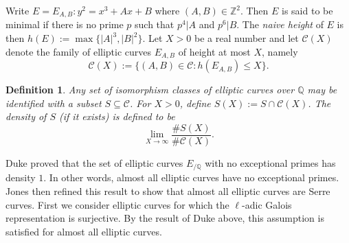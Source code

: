 \documentclass[table]{amsart}
\newtheorem{definition}[theorem]{Definition}
\newcommand{\Z}{\mathbb{Z}}
\newcommand{\Q}{\mathbb{Q}}
\newcommand{\cC}{\mathcal{C}}
\newcommand{\op}[1]{\operatorname{#1}}
\numberwithin{equation}{section}
\begin{document}
\par Write $E=E_{A,B}:y^2=x^3+Ax+B$ where $(A,B)\in \Z^2$. Then $E$ is said to be minimal if there is no prime $p$ such that $p^4|A$ and $p^6|B$. The \emph{naive height} of $E$ is then $h(E):=\op{max} \{|A|^3, |B|^2\}$. Let $X>0$ be a real number and let $\cC(X)$ denote the family of elliptic curves $E_{A,B}$ of height at most $X$, namely
\[
\cC(X):=\{(A,B)\in \cC : h(E_{A,B}) \le X\}.
\]
\begin{definition}
Any set of isomorphism classes of elliptic curves over $\Q$ may be identified with a subset $S\subseteq \cC$. For $X>0$, define $S(X):=S\cap \cC(X)$. The density of $S$ (if it exists) is defined to be
\[
\lim_{X\to\infty} \frac{\# S(X)}{\# \cC(X)}.
\]
\end{definition}
\par Duke \cite{dukeexceptional} proved that the set of elliptic curves $E_{/\Q}$ with no exceptional primes has density $1$. In other words, almost all elliptic curves have no exceptional primes. Jones \cite{jonesalmostall} then refined this result to show that almost all elliptic curves are Serre curves. First we consider elliptic curves for which the $\ell$-adic Galois representation is surjective. By the result of Duke above, this assumption is satisfied for almost all elliptic curves.
\end{document}
